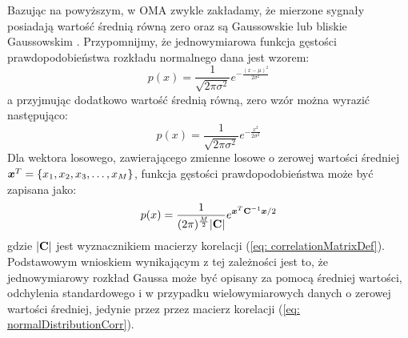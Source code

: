 Bazując na powyższym, w OMA zwykle zakładamy, że mierzone sygnały posiadają wartość średnią równą zero oraz są Gaussowskie  lub bliskie Gaussowskim \parencite{Brincker2015}. Przypomnijmy, że jednowymiarowa funkcja gęstości prawdopodobieństwa rozkładu normalnego dana jest wzorem:
\begin{equation}
	p(x) = \frac{1}{\sqrt{2\pi\sigma^2}}e^{-\frac{(x-\mu)^2}{2\sigma^2}}
\end{equation}
a przyjmując dodatkowo wartość średnią równą, zero wzór można wyrazić następująco:
\begin{equation} \label{eq:normalDensZeroMean}
	p(x) = \frac{1}{\sqrt{2\pi\sigma^2}}e^{-\frac{x^2}{2\sigma^2}}
\end{equation}
Dla wektora losowego, zawierającego zmienne losowe o zerowej wartości średniej $\bm{x}^T=\{x_1,x_2,x_3,\hdots,x_M\}$, funkcja gęstości prawdopodobieństwa może być zapisana jako:
\begin{equation}\label{eq: normalDistributionCorr}
	p(x) = \frac{1}{(2\pi)^\frac{M}{2} \mathbf{|C|}}e^{\bm{x}^T\mathbf{C}^{-1}\bm{x}/2}
\end{equation}
gdzie $|\mathbf{C}|$ jest wyznacznikiem macierzy korelacji (\ref{eq: correlationMatrixDef}).  Podstawowym wnioskiem wynikającym z tej zależności jest to, że jednowymiarowy rozkład Gaussa może być opisany za pomocą średniej wartości, odchylenia standardowego i w przypadku wielowymiarowych danych o zerowej wartości średniej, jedynie przez przez macierz korelacji (\ref{eq: normalDistributionCorr}).

